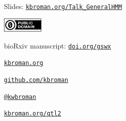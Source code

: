 \documentclass[aspectratio=169,12pt,t]{beamer}
\begin{document}
\begin{frame}[c]{}

\Large

Slides: \href{https://kbroman.org/Talk_GeneralHMM}{\tt kbroman.org/Talk\_GeneralHMM}

\vspace*{-7mm}
\hfill
\href{https://creativecommons.org/publicdomain/zero/1.0/}{\includegraphics[height=7mm]{Figs/cc-zero.png}}

\vspace{3mm}

bioRxiv manuscript:
\href{https://doi.org/gswx}{\tt \lolit doi.org/gswx}

\vspace{4mm}

\href{https://kbroman.org}{\tt \lolit kbroman.org}

\vspace{4mm}

\href{https://github.com/kbroman}{\tt \lolit github.com/kbroman}

\vspace{4mm}

\href{https://twitter.com/kwbroman}{\tt \lolit @kwbroman}

\vspace{4mm}

\href{https://kbroman.org/qtl2}{\tt \lolit kbroman.org/qtl2}





\end{frame}
\end{document}
